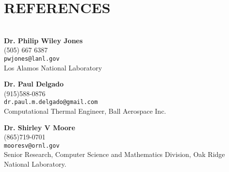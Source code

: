 \documentclass[11pt]{letter}
\begin{document}
\section{REFERENCES}
  \\
{\bf Dr. Philip Wiley Jones} \\
(505) 667 6387\\
\verb+pwjones@lanl.gov+\\
Los Alamos National Laboratory

{\bf Dr. Paul Delgado} \\
(915)588-0876\\
\verb+dr.paul.m.delgado@gmail.com+\\
Computational Thermal Engineer,
Ball Aerospace Inc.

{\bf Dr. Shirley V Moore}\\
(865)719-0701\\
\verb+mooresv@ornl.gov+\\
Senior Research,
Computer Science and Mathematics Division,
Oak Ridge National Laboratory.
\end{document}

